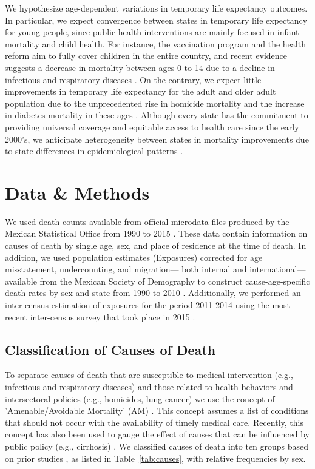 \documentclass{article}
\begin{document}
We hypothesize age-dependent variations in temporary life expectancy outcomes.
In particular, we expect convergence between states in temporary life expectancy
for young people, since public health interventions are mainly focused in infant
mortality and child health. For instance, the vaccination program and the health
reform aim to fully cover children in the entire country, and recent
evidence suggests a decrease in mortality between ages 0 to 14 due to a decline
in infectious and respiratory diseases \citep{canudas2014}. On the contrary, we
expect little improvements in temporary life expectancy for the adult and older
adult population due to the unprecedented rise in homicide mortality and the
increase in diabetes mortality in these ages \citep{canudas2014}. Although every
state has the commitment to providing universal coverage and equitable access to
health care since the early 2000's, we anticipate heterogeneity between states
in mortality improvements due to state differences in epidemiological patterns
\citep{Frenk2006}.


\section*{Data \& Methods} 
 
We used death counts available from official microdata files produced by the
Mexican Statistical Office from 1990 to 2015 \citep{INEGI}. These data contain
information on causes of death by single age, sex, and place of residence at the
time of death. In addition, we used population estimates (Exposures) corrected
for age misstatement, undercounting, and migration--- both internal and
international--- available from the Mexican Society of Demography to construct
cause-age-specific death rates by sex and state from 1990 to 2010 \citep{SOMEDE}. Additionally, we performed an inter-census estimation of exposures for the period 2011-2014 using the most recent inter-census survey that took place in 2015  \citep{INEGI}. 

\subsection*{Classification of Causes of Death}

To separate causes of death that are susceptible to medical intervention (e.g.,
infectious and respiratory diseases) and those related to health behaviors and
intersectoral policies (e.g., homicides, lung cancer) we use the concept of
'Amenable/Avoidable Mortality' (AM) \citep{nolte&mckee2004, nolte&mckee2008}. This
concept assumes a list of conditions that should not occur with the availability
of timely medical care. Recently, this concept has also been used to gauge the
effect of causes that can be influenced by public policy (e.g., cirrhosis) \citep{elo2014}. We classified causes of death into ten groups based on prior studies
\citep{elo2014, Aburto2015}, as listed in Table~\ref{tab:causes}, with
relative frequencies by sex.
\end{document}
